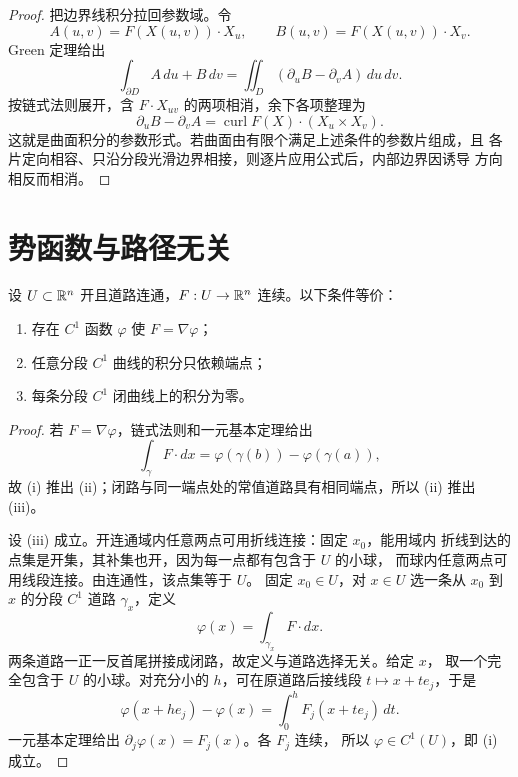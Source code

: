 \begin{proof}
把边界线积分拉回参数域。令
\[
 A(u,v)=F(X(u,v))\cdot X_u,\qquad
 B(u,v)=F(X(u,v))\cdot X_v.
\]
Green 定理给出
\[
 \int_{\partial D}A\,du+B\,dv
 =\iint_D(\partial_uB-\partial_vA)\,du\,dv.
\]
按链式法则展开，含 \(F\cdot X_{uv}\) 的两项相消，余下各项整理为
\[
 \partial_uB-\partial_vA
 =\operatorname{curl}F(X)\cdot(X_u\times X_v).
\]
这就是曲面积分的参数形式。若曲面由有限个满足上述条件的参数片组成，且
各片定向相容、只沿分段光滑边界相接，则逐片应用公式后，内部边界因诱导
方向相反而相消。
\end{proof}

\section{势函数与路径无关}

\begin{theorem}[保守场判据]
\label{thm:conservative-field-path-independence}
设 \(U\subset\mathbb{R}^n\) 开且道路连通，\(F:U\to\mathbb{R}^n\) 连续。以下条件等价：
\begin{enumerate}[label=\textup{(\roman*)}]
 \item 存在 \(C^1\) 函数 \(\varphi\) 使 \(F=\nabla\varphi\)；
 \item 任意分段 \(C^1\) 曲线的积分只依赖端点；
 \item 每条分段 \(C^1\) 闭曲线上的积分为零。
\end{enumerate}
\end{theorem}

\begin{proof}
若 \(F=\nabla\varphi\)，链式法则和一元基本定理给出
\[
 \int_\gamma F\cdot dx
 =\varphi(\gamma(b))-\varphi(\gamma(a)),
\]
故 (i) 推出 (ii)；闭路与同一端点处的常值道路具有相同端点，所以
(ii) 推出 (iii)。

设 (iii) 成立。开连通域内任意两点可用折线连接：固定 $x_0$，能用域内
折线到达的点集是开集，其补集也开，因为每一点都有包含于 $U$ 的小球，
而球内任意两点可用线段连接。由连通性，该点集等于 $U$。
固定 \(x_0\in U\)，对 \(x\in U\) 选一条从 \(x_0\)
到 \(x\) 的分段 \(C^1\) 道路 \(\gamma_x\)，定义
\[
 \varphi(x)=\int_{\gamma_x}F\cdot dx.
\]
两条道路一正一反首尾拼接成闭路，故定义与道路选择无关。给定 \(x\)，
取一个完全包含于 \(U\) 的小球。对充分小的 \(h\)，可在原道路后接线段
\(t\mapsto x+te_j\)，于是
\[
 \varphi(x+he_j)-\varphi(x)
 =\int_0^hF_j(x+te_j)\,dt.
\]
一元基本定理给出 \(\partial_j\varphi(x)=F_j(x)\)。各 \(F_j\) 连续，
所以 \(\varphi\in C^1(U)\)，即 (i) 成立。
\end{proof}

